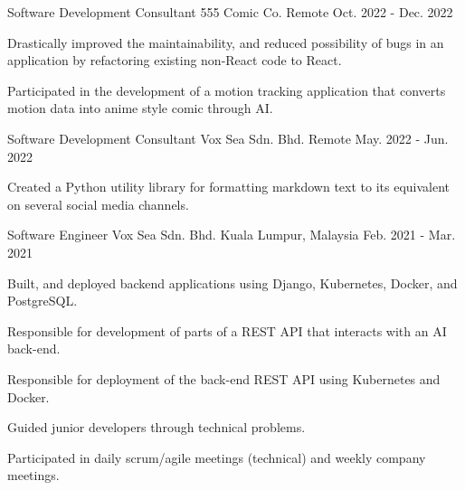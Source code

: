 

\begin{cventries}

\cventry
  {Software Development Consultant} %
  {555 Comic Co.} %
  {Remote} %
  {Oct. 2022 - Dec. 2022} %
  {
    \begin{cvitems} %
      \item {Drastically improved the maintainability, and reduced possibility of bugs in an application by refactoring existing non-React code to React.}
      \item {Participated in the development of a motion tracking application that converts motion data into anime style comic through AI.}
    \end{cvitems}
  }


  \cventry
    {Software Development Consultant} %
    {Vox Sea Sdn. Bhd.} %
    {Remote} %
    {May. 2022 - Jun. 2022} %
    {
      \begin{cvitems} %
        \item {Created a Python utility library for formatting markdown text to its equivalent on several social media channels.}
      \end{cvitems}
    }

  \cventry
    {Software Engineer} %
    {Vox Sea Sdn. Bhd.} %
    {Kuala Lumpur, Malaysia} %
    {Feb. 2021 - Mar. 2021} %
    {
      \begin{cvitems} %
        \item {Built, and deployed backend applications using Django, Kubernetes, Docker, and PostgreSQL.}
        \item {Responsible for development of parts of a REST API that interacts with an AI back-end.}
        \item {Responsible for deployment of the back-end REST API using Kubernetes and Docker.}
        \item {Guided junior developers through technical problems.}
        \item {Participated in daily scrum/agile meetings (technical) and weekly company meetings.}
      \end{cvitems}
    }


\end{cventries}
